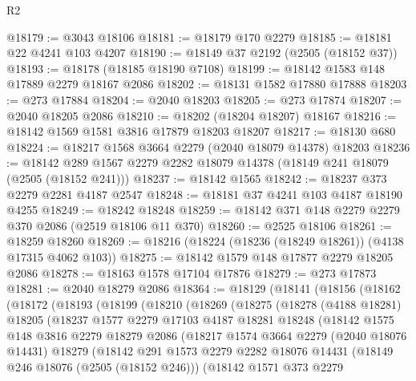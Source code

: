 \begin{lexlean}{R2}
\begin{coremodule}
@18179 := @3043 @18106
@18181 := @18179 @170 @2279
@18185 := @18181 @22 @4241 @103 @4207
@18190 := @18149 @37 @2192 (@2505 (@18152 @37))
@18193 := @18178 (@18185 @18190 @7108)
@18199 := @18142 @1583 @148 @17889 @2279 @18167 @2086
@18202 := @18131 @1582 @17880 @17888
@18203 := @273 @17884
@18204 := @2040 @18203
@18205 := @273 @17874
@18207 := @2040 @18205 @2086
@18210 := @18202 (@18204 @18207) @18167
@18216 := @18142 @1569 @1581 @3816 @17879 @18203 @18207
@18217 := @18130 @680
@18224 := @18217 @1568 @3664 @2279 (@2040 @18079 @14378) @18203
@18236 := @18142 @289 @1567 @2279 @2282 @18079 @14378 (@18149 @241 @18079 (@2505 (@18152 @241)))
@18237 := @18142 @1565
@18242 := @18237 @373 @2279 @2281 @4187 @2547
@18248 := @18181 @37 @4241 @103 @4187 @18190 @4255
@18249 := @18242 @18248
@18259 := @18142 @371 @148 @2279 @2279 @370 @2086 (@2519 @18106 @11 @370)
@18260 := @2525 @18106
@18261 := @18259 @18260
@18269 := @18216 (@18224 (@18236 (@18249 @18261)) (@4138 @17315 @4062 @103))
@18275 := @18142 @1579 @148 @17877 @2279 @18205 @2086
@18278 := @18163 @1578 @17104 @17876
@18279 := @273 @17873
@18281 := @2040 @18279 @2086
@18364 := @18129
    (@18141
      (@18156
        (@18162
          (@18172
            (@18193
              (@18199
                (@18210
                  (@18269
                    (@18275
                      (@18278
                        (@4188 @18281)
                        @18205
                        (@18237
                          @1577
                          @2279
                          @17103
                          @4187
                          @18281
                          @18248
                          (@18142
                            @1575
                            @148
                            @3816
                            @2279
                            @18279
                            @2086
                            (@18217
                              @1574
                              @3664
                              @2279
                              (@2040 @18076 @14431)
                              @18279
                              (@18142
                                @291
                                @1573
                                @2279
                                @2282
                                @18076
                                @14431
                                (@18149 @246 @18076 (@2505 (@18152 @246)))
                                (@18142
                                  @1571
                                  @373
                                  @2279

\end{coremodule}
\end{lexlean}
